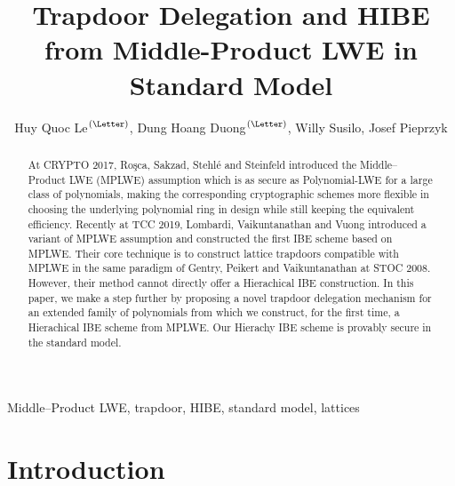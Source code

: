 \documentclass[runningheads]{llncs}
\newcommand{\keywords}[1]{\par\addvspace\baselineskip
	\noindent\keywordname\enspace\ignorespaces#1}
\begin{document}
	\title{\textbf{Trapdoor Delegation and HIBE from Middle-Product LWE in Standard Model}}

	\author{Huy Quoc Le$^\textrm{(\Letter)}$, Dung Hoang Duong$^\textrm{(\Letter)}$, Willy Susilo, Josef Pieprzyk}
	

	\maketitle
\begin{abstract}
At CRYPTO 2017, Ro{\c{s}}ca, Sakzad,  Stehl\'e and Steinfeld introduced the Middle--Product LWE (MPLWE) assumption which is as secure as Polynomial-LWE for a large class of polynomials, making the corresponding cryptographic schemes more flexible in choosing the underlying polynomial ring in design while still keeping the equivalent efficiency.
Recently at TCC 2019, Lombardi, Vaikuntanathan and Vuong introduced a variant of MPLWE assumption and constructed the first IBE scheme based on MPLWE. Their core technique is to construct lattice trapdoors compatible with MPLWE in the same paradigm of Gentry, Peikert and Vaikuntanathan at STOC 2008. However, their method cannot directly offer a Hierachical IBE construction. In this paper, we make a step further by proposing a novel trapdoor delegation mechanism for an extended family of polynomials from which we construct, for the first time, a Hierachical IBE scheme from MPLWE. Our Hierachy IBE scheme is provably secure in the standard model.
\end{abstract}

\keywords{Middle--Product LWE, trapdoor, HIBE, standard model, lattices}

\section{Introduction}
\end{document}
